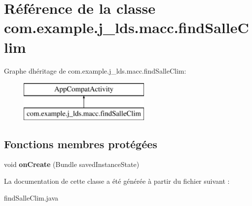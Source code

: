 \hypertarget{a00040}{}\section{Référence de la classe com.\+example.\+j\+\_\+lds.\+macc.\+find\+Salle\+Clim}
\label{a00040}
Graphe d\textquotesingle{}héritage de com.\+example.\+j\+\_\+lds.\+macc.\+find\+Salle\+Clim\+:\begin{figure}[H]
\begin{center}
\leavevmode
\includegraphics[height=2.000000cm]{a00040}
\end{center}
\end{figure}
\subsection*{Fonctions membres protégées}
\begin{DoxyCompactItemize}
\item 
\mbox{\label{a00040_a259426547026c522e5a5c6b871ac49db}} 
void {\bfseries on\+Create} (Bundle saved\+Instance\+State)
\end{DoxyCompactItemize}


La documentation de cette classe a été générée à partir du fichier suivant \+:\begin{DoxyCompactItemize}
\item 
find\+Salle\+Clim.\+java\end{DoxyCompactItemize}
